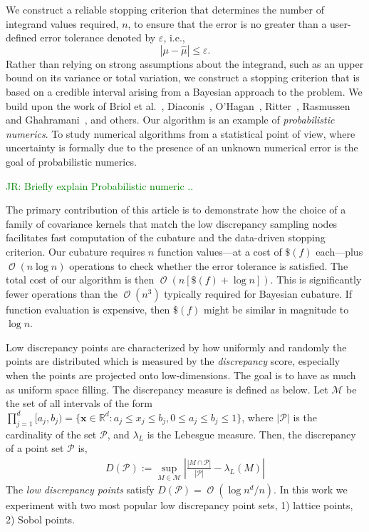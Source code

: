 \documentclass{iitthesis}          %
\DeclareMathOperator{\Order}{{\mathcal O}}
\newcommand{\bm}[1]{\boldsymbol{#1}}
\newcommand{\vx}{\bm{x}}
\newcommand{\hmu}{\widehat{\mu}}
\newcommand{\errtol}{\varepsilon}
\def\abs#1{\ensuremath{\left \lvert #1 \right \rvert}}
\newcommand{\JRNote}[1]{{\textcolor{green}{JR: #1}}}
\begin{document}
We construct a reliable stopping criterion that determines the number of integrand values required, $n$, to ensure that the error is no greater than a user-defined error tolerance denoted by $\varepsilon$, i.e., 
\begin{equation}
\label{eqn:err_crit} 
\abs{\mu - \hmu} \leq \errtol .
\end{equation}
Rather than relying on strong assumptions about the integrand, such as an upper bound on its variance or total variation, we construct a stopping criterion that is based on a credible interval arising from a Bayesian approach to the problem.  We build upon the work of Briol et al.~\cite{BriEtal18a}, Diaconis~\cite{Dia88a}, O'Hagan~\cite{OHa91a}, Ritter~\cite{Rit00a}, Rasmussen and Ghahramani~\cite{RasGha03a}, and others.  Our algorithm is an example of \emph{probabilistic numerics}.
To study numerical algorithms from a statistical point of view, where uncertainty is formally due to the presence of an unknown numerical error is the goal of probabilistic numerics.

\JRNote{Briefly explain Probabilistic numeric ..}

The primary contribution of this article is to demonstrate how the choice of a family of covariance kernels that match the low discrepancy sampling nodes facilitates fast computation of the cubature and the data-driven stopping criterion.  Our cubature requires $n$ function values---at a cost of $\$(f)$ each---plus $\Order(n \log n)$ operations to check whether the error tolerance is satisfied.  The total cost of our algorithm is then $\Order(n [\$(f) + \log n])$.  This is significantly fewer operations than the $\Order(n^3)$ typically required for Bayesian cubature.  If function evaluation is expensive, then $\$(f)$ might be similar in magnitude to $\log n$.


Low discrepancy points are characterized by how uniformly and randomly the points are distributed which is measured by the \emph{discrepancy} score, especially when the points are projected onto low-dimensions. The goal is to have as much as uniform space filling. The discrepancy measure is defined as below.
Let $\mathcal{M}$ be the set of all intervals of the form $\prod_{j=1}^{d} [a_j, b_j) = \{ \vx \in \mathbb{R}^d : a_j \le x_j \le b_j, 0 \le a_j \le b_j \le 1 \}$, where $\abs{\mathcal{P}}$ is the cardinality of the set $\mathcal{P}$, and $\lambda_L$ is the Lebesgue measure. Then, the discrepancy of a point set $\mathcal{P}$ is,
\begin{align*}
D(\mathcal{P}) := \sup_{M \in \mathcal{M}} 
\abs{ \frac{\abs{M \cap \mathcal{P}}}{\abs{\mathcal{P}}} - \lambda_L(M) }
\end{align*}
The \emph{low discrepancy points} satisfy $D(\mathcal{P}) = \Order(\log n^d/n)$.
In this work we experiment with two most popular low discrepancy point sets, 1) lattice points, 2) Sobol points.
\end{document}
